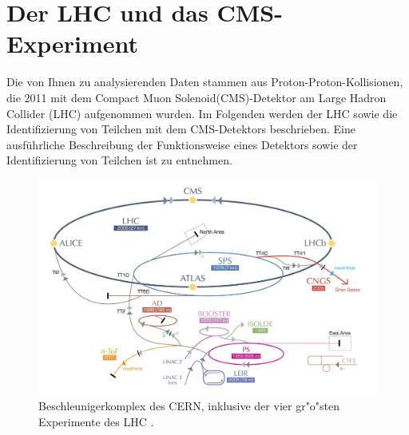 \section{Der LHC und das CMS-Experiment}
\label{lhccms_chapter}
Die von Ihnen zu analysierenden Daten stammen aus Proton-Proton-Kollisionen, die 2011 mit dem Compact Muon Solenoid(CMS)-Detektor am Large Hadron Collider (LHC) aufgenommen wurden. Im Folgenden werden der LHC \cite{LHC} sowie die Identifizierung von Teilchen mit dem CMS-Detektors beschrieben. Eine ausf\"uhrliche Beschreibung der Funktionsweise eines Detektors sowie der Identifizierung von Teilchen ist \cite{Kleinknecht:1984jt,Grupen:PD} zu entnehmen. 
\begin{figure}[t]
	\centering
	\includegraphics[scale=0.35]{LHC/CERNkomplex}
	\caption[Beschleunigerkomplex des CERN]{Beschleunigerkomplex des CERN, inklusive der vier gr"o"sten Experimente des LHC \cite{cernkomplex}.}
	\label{cernkomplex}
\end{figure}

